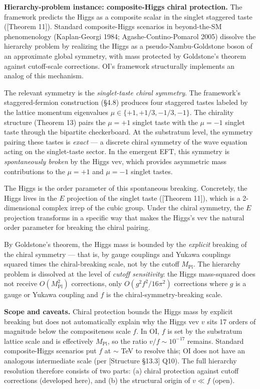 \documentclass[
]{article}
\begin{document}
\textbf{Hierarchy-problem instance: composite-Higgs chiral protection.}
The framework predicts the Higgs as a composite scalar in the singlet
staggered taste ({[}Theorem 11{]}). Standard composite-Higgs scenarios
in beyond-the-SM phenomenology (Kaplan-Georgi 1984;
Agashe-Contino-Pomarol 2005) dissolve the hierarchy problem by realizing
the Higgs as a pseudo-Nambu-Goldstone boson of an approximate global
symmetry, with mass protected by Goldstone's theorem against
cutoff-scale corrections. OI's framework structurally implements an
analog of this mechanism.

The relevant symmetry is the \emph{singlet-taste chiral symmetry}. The
framework's staggered-fermion construction (§4.8) produces four
staggered tastes labeled by the lattice momentum eigenvalues
\(\mu \in \{+1, +1/3, -1/3, -1\}\). The chirality structure (Theorem 13)
pairs the \(\mu = +1\) singlet taste with the \(\mu = -1\) singlet taste
through the bipartite checkerboard. At the substratum level, the
symmetry pairing these tastes is \emph{exact} --- a discrete chiral
symmetry of the wave equation acting on the singlet-taste sector. In the
emergent EFT, this symmetry is \emph{spontaneously broken} by the Higgs
vev, which provides asymmetric mass contributions to the \(\mu = +1\)
and \(\mu = -1\) singlet tastes.

The Higgs is the order parameter of this spontaneous breaking.
Concretely, the Higgs lives in the \(E\) projection of the singlet taste
({[}Theorem 11{]}), which is a 2-dimensional complex irrep of the cubic
group. Under the chiral symmetry, the \(E\) projection transforms in a
specific way that makes the Higgs's vev the natural order parameter for
breaking the chiral pairing.

By Goldstone's theorem, the Higgs mass is bounded by the \emph{explicit}
breaking of the chiral symmetry --- that is, by gauge couplings and
Yukawa couplings squared times the chiral-breaking scale, not by the
cutoff \(M_{\mathrm{Pl}}\). The hierarchy problem is dissolved at the
level of \emph{cutoff sensitivity}: the Higgs mass-squared does not
receive \(O(M_{\mathrm{Pl}}^2)\) corrections, only
\(O(g^2 f^2 / 16\pi^2)\) corrections where \(g\) is a gauge or Yukawa
coupling and \(f\) is the chiral-symmetry-breaking scale.

\textbf{Scope and caveats.} Chiral protection bounds the Higgs mass by
explicit breaking but does not automatically explain why the Higgs vev
\(v\) sits 17 orders of magnitude below the compositeness scale \(f\).
In OI, \(f\) is set by the substratum lattice scale and is effectively
\(M_{\mathrm{Pl}}\), so the ratio \(v/f \sim 10^{-17}\) remains.
Standard composite-Higgs scenarios put \(f\) at \(\sim\) TeV to resolve
this; OI does not have an analogous intermediate scale (per {[}Structure
§13.3{]} Q10). The full hierarchy resolution therefore consists of two
parts: (a) chiral protection against cutoff corrections (developed
here), and (b) the structural origin of \(v \ll f\) (open).
\end{document}
